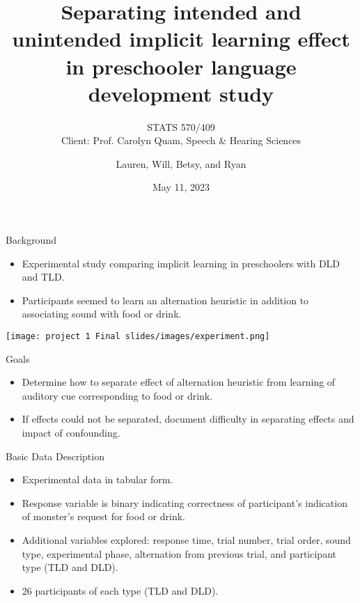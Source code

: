 \documentclass[
]{beamer}
\title[Mock Presentation]{Separating intended and unintended implicit learning effect in preschooler language development study}
\subtitle[Short Subtitle]{STATS 570/409 \\ Client: Prof. Carolyn Quam, Speech \& Hearing Sciences}
\author[Data Whisperers]{Lauren, Will, Betsy, and Ryan \texorpdfstring{\\}{, }}
\institute[PSU]{Portland State University}
\date{May 11, 2023}
\begin{document}
\begin{frame}%
\maketitle
\end{frame}



\begin{frame}{Background}
\begin{itemize}
    \item Experimental study comparing implicit learning in preschoolers with DLD and TLD.
    \item Participants seemed to learn an alternation heuristic in addition to associating sound with food or drink.
\end{itemize}
\centering
\texttt{[image: project 1 Final slides/images/experiment.png]}
\end{frame}


\begin{frame}{Goals}
\begin{itemize}
    \item Determine how to separate effect of alternation heuristic from learning of auditory cue corresponding to food or drink.
    \item If effects could not be separated, document difficulty in separating effects and impact of confounding.
\end{itemize}

\end{frame}


\begin{frame}{Basic Data Description}
\begin{itemize}
    \item Experimental data in tabular form.
    \item Response variable is binary indicating correctness of participant's indication of monster's request for food or drink.
    \item Additional variables explored: response time,  trial number,  trial order,  sound type,  experimental phase,  alternation from previous trial,  and participant type (TLD and DLD).
    \item 26 participants of each type (TLD and DLD).
\end{itemize}
\end{frame}
\end{document}
